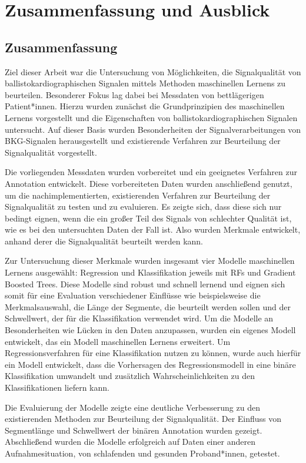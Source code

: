 \chapter{Zusammenfassung und Ausblick}\label{zusammenfassung}

\section{Zusammenfassung}

Ziel dieser Arbeit war die Untersuchung von Möglichkeiten, die Signalqualität von ballistokardiographischen Signalen mittels Methoden maschinellen Lernens zu beurteilen. Besonderer Fokus lag dabei bei Messdaten von bettlägerigen Patient*innen. Hierzu wurden zunächst die Grundprinzipien des maschinellen Lernens vorgestellt und die Eigenschaften von ballistokardiographischen Signalen untersucht. Auf dieser Basis wurden Besonderheiten der Signalverarbeitungen von \ac{BKG}-Signalen herausgestellt und existierende Verfahren zur Beurteilung der Signalqualität vorgestellt.

Die vorliegenden Messdaten wurden vorbereitet und ein geeignetes Verfahren zur Annotation entwickelt. Diese vorbereiteten Daten wurden anschließend genutzt, um die nachimplementierten, existierenden Verfahren zur Beurteilung der Signalqualität zu testen und zu evaluieren. Es zeigte sich, dass diese sich nur bedingt eignen, wenn die ein großer Teil des Signals von schlechter Qualität ist, wie es bei den untersuchten Daten der Fall ist. Also wurden Merkmale entwickelt, anhand derer die Signalqualität beurteilt werden kann.

Zur Untersuchung dieser Merkmale wurden insgesamt vier Modelle maschinellen Lernens ausgewählt: Regression und Klassifikation jeweils mit \acl{RF}s und Gradient Boosted Trees. Diese Modelle sind robust und schnell lernend und eignen sich somit für eine Evaluation verschiedener Einflüsse wie beispielsweise die Merkmalsauswahl, die Länge der Segmente, die beurteilt werden sollen und der Schwellwert, der für die Klassifikation verwendet wird. Um die Modelle an Besonderheiten wie Lücken in den Daten anzupassen, wurden ein eigenes Modell entwickelt, das ein Modell maschinellen Lernens erweitert. Um Regressionsverfahren für eine Klassifikation nutzen zu können, wurde auch hierfür ein Modell entwickelt, dass die Vorhersagen des Regressionsmodell in eine binäre Klassifikation umwandelt und zusätzlich Wahrscheinlichkeiten zu den Klassifikationen liefern kann.

Die Evaluierung der Modelle zeigte eine deutliche Verbesserung zu den existierenden Methoden zur Beurteilung der Signalqualität. Der Einfluss von Segmentlänge und Schwellwert der binären Annotation wurden gezeigt. Abschließend wurden die Modelle erfolgreich auf Daten einer anderen Aufnahmesituation, von schlafenden und gesunden Proband*innen, getestet.

